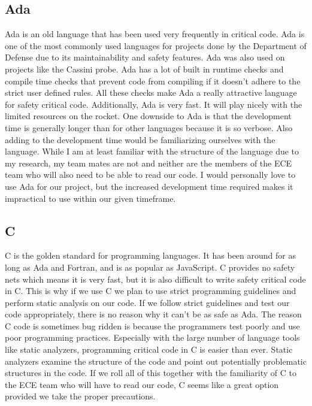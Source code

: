 \documentclass[onecolumn, draftclsnofoot,10pt, compsoc]{IEEEtran}
\begin{document}
\subsection{Ada}
Ada is an old language that has been used very frequently in critical code.
Ada is one of the most commonly used languages for projects done by the Department of Defense due to its maintainability and safety features.
Ada was also used on projects like the Cassini probe.
Ada has a lot of built in runtime checks and compile time checks that prevent code from compiling if it doesn't adhere to the strict user defined rules.
All these checks make Ada a really attractive language for safety critical code.
Additionally, Ada is very fast.
It will play nicely with the limited resources on the rocket.
One downside to Ada is that the development time is generally longer than for other languages because it is so verbose.
Also adding to the development time would be familiarizing ourselves with the language.
While I am at least familiar with the structure of the language due to my research, my team mates are not and neither are the members of the ECE team who will also need to be able to read our code.
I would personally love to use Ada for our project, but the increased development time required makes it impractical to use within our given timeframe.

\subsection{C}
C is the golden standard for programming languages.
It has been around for as long as Ada and Fortran, and is as popular as JavaScript.
C provides no safety nets which means it is very fast, but it is also difficult to write safety critical code in C.
This is why if we use C we plan to use strict programming guidelines and perform static analysis on our code.
If we follow strict guidelines and test our code appropriately, there is no reason why it can't be as safe as Ada.
The reason C code is sometimes bug ridden is because the programmers test poorly and use poor programming practices.
Especially with the large number of language tools like static analyzers, programming critical code in C is easier than ever.
Static analyzers examine the structure of the code and point out potentially problematic structures in the code.
If we roll all of this together with the familiarity of C to the ECE team who will have to read our code, C seems like a great option provided we take the proper precautions.
\end{document}
